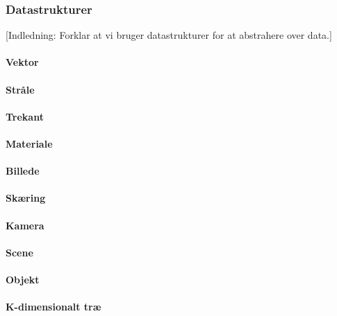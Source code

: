 \subsubsection{Datastrukturer}
[Indledning: Forklar at vi bruger datastrukturer for at abstrahere over data.]
\paragraph{Vektor}
\paragraph{Stråle}
\paragraph{Trekant}
\paragraph{Materiale}

\paragraph{Billede}

\paragraph{Skæring}
\paragraph{Kamera}
\paragraph{Scene}
\paragraph{Objekt}
\paragraph{K-dimensionalt træ}
